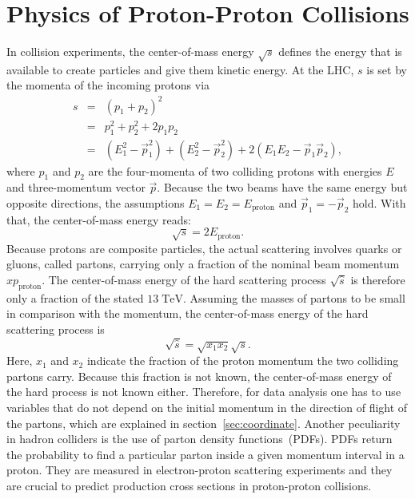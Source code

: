 \section{Physics of Proton-Proton Collisions}
	In collision experiments, the center-of-mass energy $\sqrt{s}$ defines the energy that is available to create particles and give them kinetic energy. At the LHC, $s$ is set by the momenta of the incoming protons via
	\begin{eqnarray}
	s &=& (p_1 + p_2)^2 \\
	  &=& p_1^2 + p_2^2 + 2 p_1 p_2 \\
	  &=& (E_1^2 - \vec{p}_1^2 )  + (E_2^2 - \vec{p}_2^2 ) + 2 (E_1 E_2 - \vec{p}_1 \vec{p}_2 ),
	\end{eqnarray}
	where $p_1$ and $p_2$ are the four-momenta of two colliding protons with energies $E$ and three-momentum vector $\vec{p}$. Because the two beams have the same energy but opposite directions, the assumptions $E_1 = E_2 = E_\text{proton}$ and $\vec{p}_1 = -\vec{p}_2$ hold. With that, the center-of-mass energy reads:
	\begin{equation}
	\sqrt{s} = 2 E_\text{proton}.
	\end{equation}
	Because protons are composite particles, the actual scattering involves quarks or gluons, called partons, carrying only a fraction of the nominal beam momentum $x p_\text{proton}$. The center-of-mass energy of the hard scattering process $\sqrt{\hat{s}}$ is therefore only a fraction of the stated $13\;\text{TeV}$. Assuming the masses of partons to be small in comparison with the momentum, the center-of-mass energy of the hard scattering process is
	\begin{equation}
	\sqrt{\hat{s}} = \sqrt{x_1 x_2} \sqrt{s}.
	\end{equation} 
	Here, $x_1$ and $x_2$ indicate the fraction of the proton momentum the two colliding partons carry. Because this fraction is not known, the center-of-mass energy of the hard process is not known either. Therefore, for data analysis one has to use variables that do not depend on the initial momentum in the direction of flight of the partons, which are explained in section~\ref{sec:coordinate}. Another peculiarity in hadron colliders is the use of parton density functions~(PDFs). PDFs return the probability to find a particular parton inside a given momentum interval in a proton. They are measured in electron-proton scattering experiments \cite{pdf} and they are crucial to predict production cross sections in proton-proton collisions.
		
